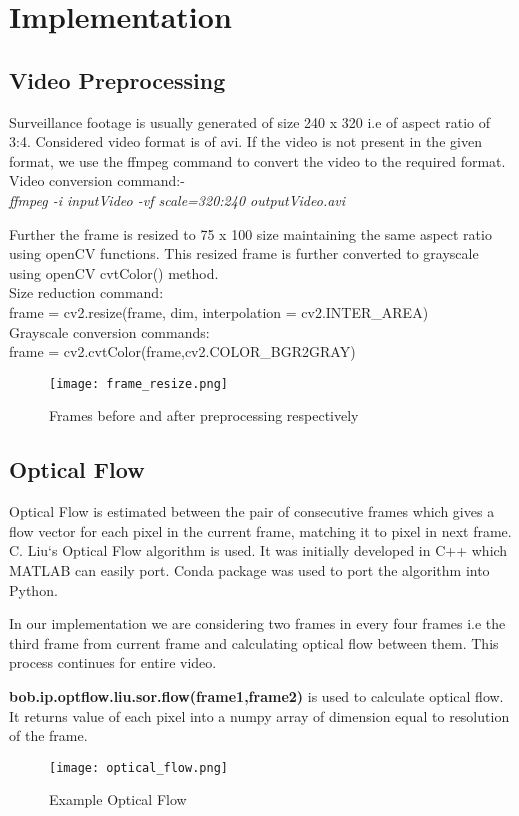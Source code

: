 \chapter{Implementation}
\section{Video Preprocessing}
Surveillance footage is usually generated of size 240 x 320 i.e of aspect ratio of 3:4. Considered video format is of avi. If the video is not present in the given format, we use the ffmpeg command to convert the video to the required format. 
\\
Video conversion command:-\\
\textit{ffmpeg -i {inputVideo} -vf scale=320:240 outputVideo.avi}
\par
Further the frame is resized to 75 x 100 size maintaining the same aspect ratio using openCV functions. This resized frame is further converted to grayscale using openCV cvtColor() method. \\
Size reduction command:\\
frame = cv2.resize(frame, dim, interpolation = cv2.INTER\_AREA)\\
Grayscale conversion commands: \\
frame = cv2.cvtColor(frame,cv2.COLOR\_BGR2GRAY)
\begin{center}
\begin{figure}[H]
\centering
\texttt{[image: frame\_resize.png]}
\caption{Frames before and after preprocessing respectively}
\end{figure}
\end{center}
\section{Optical Flow}
Optical Flow is estimated between the pair of consecutive frames which gives a flow vector for each pixel in the current frame, matching it to pixel in next frame. C. Liu`s Optical Flow algorithm is used. It was initially developed in C++ which MATLAB can easily port. Conda package was used to port the algorithm into Python. \par
	In our implementation we are considering two frames in every four frames i.e the third frame from current frame and calculating optical flow between them. This process continues for entire video. \par \textbf{bob.ip.optflow.liu.sor.flow(frame1,frame2)} is used to calculate optical flow. It returns value of each pixel into a numpy array of dimension equal to resolution of the frame.
\begin{center}
\begin{figure}[H]
\centering
\texttt{[image: optical\_flow.png]}
\caption{Example Optical Flow}
\end{figure}
\end{center}

